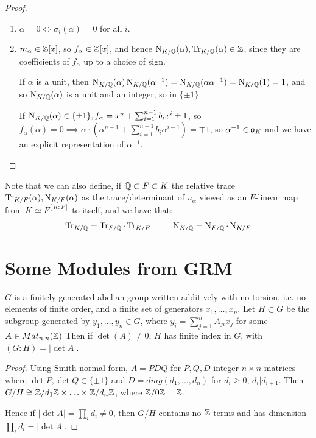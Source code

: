 \documentclass[10pt,a4paper]{article}
\begin{document}
\begin{proof}
\item
\begin{enumerate}
\item $\alpha = 0 \iff \sigma_i(\alpha) = 0$ for all $i$.
\item $m_\alpha \in \mathbb{Z}[x]$, so $f_\alpha \in \mathbb{Z}[x]$, and hence $\operatorname{N}_{K/\mathbb{Q}}(\alpha), \operatorname{Tr}_{K/\mathbb{Q}}(\alpha) \in \mathbb{Z}$, since they are coefficients of $f_{\alpha}$ up to a choice of sign. 

If $\alpha$ is a unit, then $\operatorname{N}_{K/\mathbb{Q}}(\alpha)\operatorname{N}_{K/\mathbb{Q}}(\alpha^{-1}) = \operatorname{N}_{K/\mathbb{Q}}(\alpha\alpha^{-1}) = \operatorname{N}_{K/\mathbb{Q}}(1) = 1$, and so $\operatorname{N}_{K/\mathbb{Q}}(\alpha)$ is a unit and an integer, so in $\{\pm 1\}$.

If $\operatorname{N}_{K/\mathbb{Q}}(\alpha) \in \{\pm 1\}, f_\alpha = x^n + \sum_{i=1}^{n-1} b_i x^i \pm 1$, so $f_\alpha(\alpha) = 0 \implies \alpha\cdot\left(\alpha^{n-1}+\sum_{i=1}^{n-1}b_i\alpha^{i-1}\right) = \mp 1$, so $\alpha^{-1} \in \mathfrak{o}_K$ and we have an explicit representation of $\alpha^{-1}$.
\end{enumerate}
\end{proof}

Note that we can also define, if $\mathbb{Q} \subset F \subset K$ the relative trace $\operatorname{Tr}_{K/F}(\alpha), \operatorname{N}_{K/F}(\alpha)$ as the trace/determinant of $u_{\alpha}$ viewed as an $F$-linear map from $K \simeq F^{[K:F]}$ to itself, and we have that:
\begin{align*}
\operatorname{Tr}_{K/\mathbb{Q}} = \operatorname{Tr}_{F/\mathbb{Q}}\cdot\operatorname{Tr}_{K/F}\;\;\;\;\;\;\;\;\; \operatorname{N}_{K/\mathbb{Q}} = \operatorname{N}_{F/\mathbb{Q}}\cdot\operatorname{N}_{K/F}
\end{align*}

\section{Some Modules from GRM}
\begin{proposition}
$G$ is a finitely generated abelian group written additively with no torsion, i.e. no elements of finite order, and a finite set of generators $x_1, \ldots, x_n$. Let $H \subset G$ be the subgroup generated by $y_1, \ldots, y_n \in G$, where $y_i = \sum_{j=1}^n A_{ji}x_j$ for some $A \in Mat_{n,n}(\mathbb{Z})$ Then if $\det(A) \neq 0$, $H$ has finite index in $G$, with $(G:H) = |\det A|$.
\end{proposition}
\begin{proof}
Using Smith normal form, $A = PDQ$ for $P,Q,D$ integer $n\times n$ matrices where $\det P, \det Q \in \{\pm 1\}$ and $D = diag(d_1, \ldots, d_n)$ for $d_i \geq 0$, $d_i | d_{i+1}$. Then $G/H \cong \mathbb{Z}/d_1\mathbb{Z} \times \ldots \times \mathbb{Z}/d_n\mathbb{Z}$, where $\mathbb{Z}/0\mathbb{Z} = \mathbb{Z}$.

Hence if $|\det A| = \prod_i d_i \neq 0$, then $G/H$ contains no $\mathbb{Z}$ terms and has dimension $\prod_i d_i = |\det A|$.
\end{proof}
\end{document}
